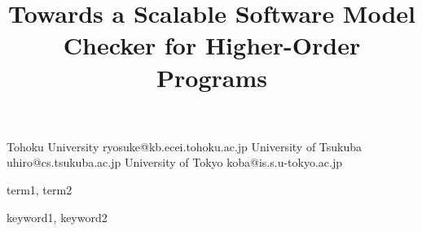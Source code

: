 \documentclass[preprint]{sigplanconf}
\begin{document}
\copyrightdata{[to be supplied]}

\title{Towards a Scalable Software Model Checker for Higher-Order Programs}

           {Tohoku University}
           {ryosuke@kb.ecei.tohoku.ac.jp}
           {University of Tsukuba}
           {uhiro@cs.tsukuba.ac.jp}
           {University of Tokyo}
           {koba@is.s.u-tokyo.ac.jp}

\maketitle




\terms
term1, term2

\keywords
keyword1, keyword2


%












%
\end{document}
